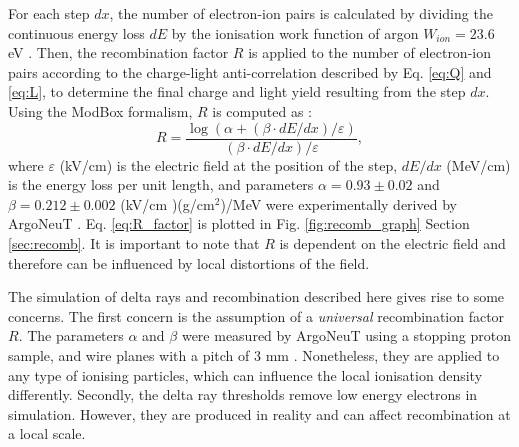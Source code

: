 For each step $dx$, the number of electron-ion pairs is calculated by dividing the continuous energy loss $dE$ by the ionisation work function of argon $W_{ion} = 23.6$ eV \cite{wion_lar}.
Then, the recombination factor $R$ is applied to the number of electron-ion pairs according to the charge-light anti-correlation described by Eq. \ref{eq:Q} and \ref{eq:L}, to determine the final charge and light yield resulting from the step $dx$.                                                                                                                                                      
Using the ModBox formalism, $R$ is computed as \cite{argoneut_recomb}:
\begin{equation}
        \label{eq:R_factor}
        R = \frac{\log{ \left( \alpha + \left(\beta \cdot dE/dx\right)/\varepsilon \right)}}{\left(\beta \cdot dE/dx\right)/\varepsilon},
\end{equation}
where $\varepsilon$ (kV/cm) is the electric field at the position of the step, $dE/dx$ (MeV/cm) is the energy loss per unit length, and parameters $\alpha = 0.93\pm0.02$ and $\beta = 0.212\pm0.002$ (kV/cm
)(g/cm$^{2}$)/MeV were experimentally derived by ArgoNeuT \cite{argoneut_recomb}.
Eq. \ref{eq:R_factor} is plotted in Fig. \ref{fig:recomb_graph} Section \ref{sec:recomb}.
It is important to note that $R$ is dependent on the electric field and therefore can be influenced by local distortions of the field.

The simulation of delta rays and recombination described here gives rise to some concerns.
The first concern is the assumption of a \textit{universal} recombination factor $R$.
The parameters $\alpha$ and $\beta$ were measured by ArgoNeuT using a stopping proton sample, and wire planes with a pitch of 3 mm \cite{argoneut_recomb}.
Nonetheless, they are applied to any type of ionising particles, which can influence the local ionisation density differently. 
Secondly, the delta ray thresholds remove low energy electrons in simulation.
However, they are produced in reality and can affect recombination at a local scale. 

